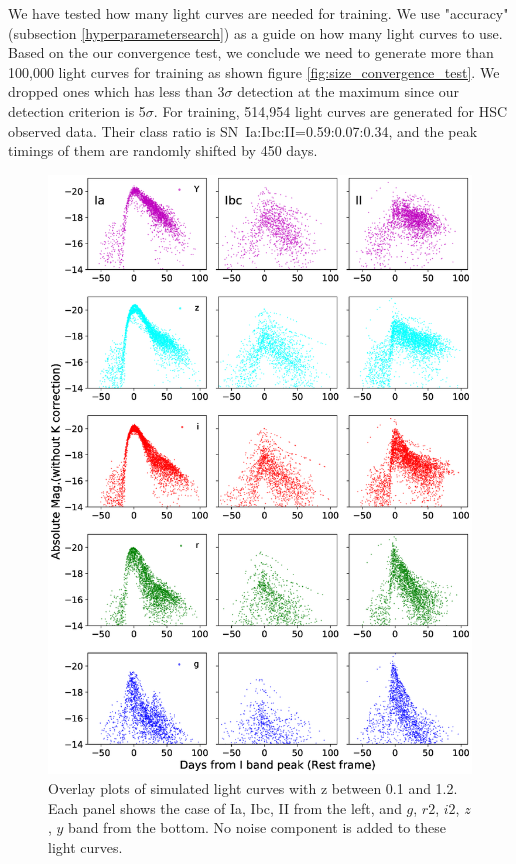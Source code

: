 \documentclass[useamsfonts]{pasj01}
\begin{document}
We have tested how many light curves are needed for training.  We use "accuracy" (subsection \ref{hyperparametersearch}) as a guide on how many light curves to use.  
Based on the our convergence test, we conclude we need to generate more than 100,000 light curves for training as shown figure \ref{fig:size_convergence_test}.
We dropped ones which has less than 3$\sigma$ detection at the maximum since our detection criterion is 5$\sigma$.  %
For training, 514,954 light curves are generated for HSC observed data. 
Their class ratio is SN~Ia:Ibc:II=0.59:0.07:0.34, and the peak timings of them are randomly shifted by 450 days.
%
%
\begin{figure}[htbp]
  \begin{center}
     \includegraphics[width=\columnwidth]{figures/SimLCsamples.eps}
  \end{center}
  \vspace{-6mm}
  \caption{%
  Overlay plots of simulated light curves with z between 0.1 and 1.2.
  Each panel shows the case of Ia, Ibc, II from the left, and $g$, $r2$, $i2$, $z$, $y$ band from the bottom.
  No noise component is added to these light curves.
  }%
  
  \label{fig:simLCsamples}
\end{figure}
\end{document}
